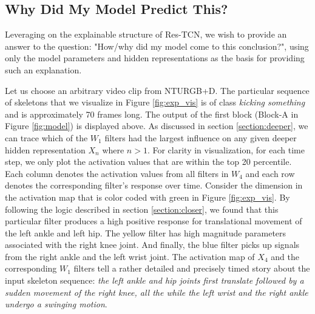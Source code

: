 \documentclass[10pt,twocolumn,letterpaper]{article}
\begin{document}
\subsection{Why Did My Model Predict This?}
Leveraging on the explainable structure of Res-TCN, we wish to provide an answer to the question: "How/why did my model come to this conclusion?", using only the model parameters and hidden representations as the basis for providing such an explanation. 

Let us choose an arbitrary video clip from NTURGB+D. The particular sequence of skeletons that we visualize in Figure \ref{fig:exp_vis} is of class \textit{kicking something} and is approximately 70 frames long. The output of the first block (Block-A in Figure \ref{fig:model}) is displayed above. As discussed in section \ref{section:deeper}, we can trace which of the $W_1$ filters had the largest influence on any given deeper hidden representation $X_n$ where $n > 1$. For clarity in visualization, for each time step, we only plot the activation values that are within the top 20 percentile. Each column denotes the activation values from all filters in $W_4$ and each row denotes the corresponding filter's response over time. Consider the dimension in the activation map that is color coded with green in Figure \ref{fig:exp_vis}. By following the logic described in section \ref{section:closer},  we found that this particular filter produces a high positive response for translational movement of the left ankle and left hip. The yellow filter has high magnitude parameters associated with the right knee joint. And finally, the blue filter picks up signals from the right ankle and the left wrist joint. The activation map of $X_4$ and the corresponding $W_1$ filters tell a rather detailed and precisely timed story about the input skeleton sequence: \textit{the left ankle and hip joints first translate followed by a sudden movement of the right knee, all the while the left wrist and the right ankle undergo a swinging motion}. 
\end{document}
